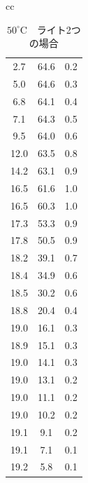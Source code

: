 \begin{itemize}
\begin{table}[p]
\begin{tabular}{cc}
\begin{minipage}[t]{0.5\hsize}
{\begin{tabular}{ccc}
	2.7  & 64.6 & 0.2 \\
	5.0  & 64.6 & 0.3 \\
	6.8  & 64.1 & 0.4 \\
	7.1  & 64.3 & 0.5 \\
	9.5  & 64.0 & 0.6 \\
	12.0 & 63.5 & 0.8 \\
	14.2 & 63.1 & 0.9 \\
	16.5 & 61.6 & 1.0 \\
	16.5 & 60.3 & 1.0 \\
	17.3 & 53.3 & 0.9 \\
	17.8 & 50.5 & 0.9 \\
	18.2 & 39.1 & 0.7 \\
	18.4 & 34.9 & 0.6 \\
	18.5 & 30.2 & 0.6 \\
	18.8 & 20.4 & 0.4 \\
	19.0 & 16.1 & 0.3 \\
	18.9 & 15.1 & 0.3 \\
	19.0 & 14.1 & 0.3 \\
	19.0 & 13.1 & 0.2 \\
	19.0 & 11.1 & 0.2 \\
	19.0 & 10.2 & 0.2 \\
	19.1 & 9.1  & 0.2 \\
	19.1 & 7.1  & 0.1 \\
	19.2 & 5.8  & 0.1 \\
	\hline
	\end{tabular}
	}
	\end{minipage}
	\begin{minipage}[t]{0.5\hsize}
	\centering
	\caption{$50^{\circ}$C　ライト2つの場合}
	\label{tab:50-two}
\end{minipage}
\end{tabular}
\end{table}
\end{itemize}
